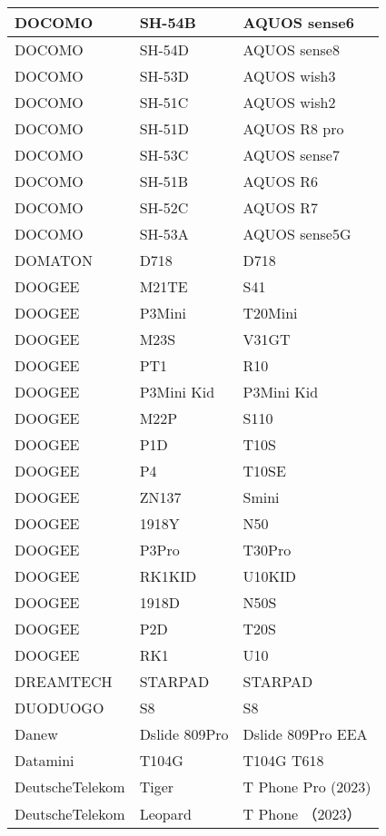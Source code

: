 \begin{tabularx}{\linewidth}{|l|X|X|}
        DOCOMO & SH-54B & AQUOS sense6 \\ \hline
        DOCOMO & SH-54D & AQUOS sense8 \\ \hline
        DOCOMO & SH-53D & AQUOS wish3 \\ \hline
        DOCOMO & SH-51C & AQUOS wish2 \\ \hline
        DOCOMO & SH-51D & AQUOS R8 pro \\ \hline
        DOCOMO & SH-53C & AQUOS sense7 \\ \hline
        DOCOMO & SH-51B & AQUOS R6 \\ \hline
        DOCOMO & SH-52C & AQUOS R7 \\ \hline
        DOCOMO & SH-53A & AQUOS sense5G \\ \hline
        DOMATON & D718 & D718 \\ \hline
        DOOGEE & M21TE & S41 \\ \hline
        DOOGEE & P3Mini & T20Mini \\ \hline
        DOOGEE & M23S & V31GT \\ \hline
        DOOGEE & PT1 & R10 \\ \hline
        DOOGEE & P3Mini Kid & P3Mini Kid \\ \hline
        DOOGEE & M22P & S110 \\ \hline
        DOOGEE & P1D & T10S \\ \hline
        DOOGEE & P4 & T10SE \\ \hline
        DOOGEE & ZN137 & Smini \\ \hline
        DOOGEE & 1918Y & N50 \\ \hline
        DOOGEE & P3Pro & T30Pro \\ \hline
        DOOGEE & RK1KID & U10KID \\ \hline
        DOOGEE & 1918D & N50S \\ \hline
        DOOGEE & P2D & T20S \\ \hline
        DOOGEE & RK1 & U10 \\ \hline
        DREAMTECH & STARPAD & STARPAD \\ \hline
        DUODUOGO & S8 & S8 \\ \hline
        Danew & Dslide 809Pro & Dslide 809Pro EEA \\ \hline
        Datamini & T104G & T104G T618 \\ \hline
        DeutscheTelekom & Tiger & T Phone Pro (2023) \\ \hline
        DeutscheTelekom & Leopard & T Phone （2023） \\ \hline

\end{tabularx}
